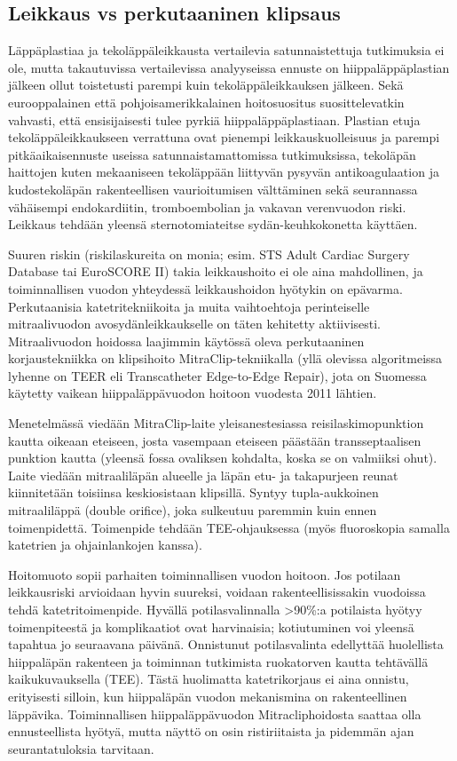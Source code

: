 \documentclass[
]{book}
\begin{document}
\subsection{Leikkaus vs perkutaaninen klipsaus}\label{leikkaus-vs-perkutaaninen-klipsaus}

Läppäplastiaa ja tekoläppäleikkausta vertailevia satunnaistettuja tutkimuksia ei ole, mutta takautuvissa vertailevissa analyyseissa ennuste on hiippaläppäplastian jälkeen ollut toistetusti parempi kuin tekoläppäleikkauksen jälkeen. Sekä eurooppalainen että pohjoisamerikkalainen hoitosuositus suosittelevatkin vahvasti, että ensisijaisesti tulee pyrkiä hiippaläppäplastiaan. Plastian etuja tekoläppäleikkaukseen verrattuna ovat pienempi leikkauskuolleisuus ja parempi pitkäaikaisennuste useissa satunnaistamattomissa tutkimuksissa, tekoläpän haittojen kuten mekaaniseen tekoläppään liittyvän pysyvän antikoagulaation ja kudostekoläpän rakenteellisen vaurioitumisen välttäminen sekä seurannassa vähäisempi endokardiitin, tromboembolian ja vakavan verenvuodon riski. Leikkaus tehdään yleensä sternotomiateitse sydän-keuhkokonetta käyttäen.

Suuren riskin (riskilaskureita on monia; esim. STS Adult Cardiac Surgery Database tai EuroSCORE II) takia leikkaushoito ei ole aina mahdollinen, ja toiminnallisen vuodon yhteydessä leikkaushoidon hyötykin on epävarma. Perkutaanisia katetritekniikoita ja muita vaihtoehtoja perinteiselle mitraalivuodon avosydänleikkaukselle on täten kehitetty aktiivisesti. Mitraalivuodon hoidossa laajimmin käytössä oleva perkutaaninen korjaustekniikka on klipsihoito MitraClip-tekniikalla (yllä olevissa algoritmeissa lyhenne on TEER eli Transcatheter Edge-to-Edge Repair), jota on Suomessa käytetty vaikean hiippaläppävuodon hoitoon vuodesta 2011 lähtien.

Menetelmässä viedään MitraClip-laite yleisanestesiassa reisilaskimopunktion kautta oikeaan eteiseen, josta vasempaan eteiseen päästään transseptaalisen punktion kautta (yleensä fossa ovaliksen kohdalta, koska se on valmiiksi ohut). Laite viedään mitraaliläpän alueelle ja läpän etu- ja takapurjeen reunat kiinnitetään toisiinsa keskiosistaan klipsillä. Syntyy tupla-aukkoinen mitraaliläppä (double orifice), joka sulkeutuu paremmin kuin ennen toimenpidettä. Toimenpide tehdään TEE-ohjauksessa (myös fluoroskopia samalla katetrien ja ohjainlankojen kanssa).

Hoitomuoto sopii parhaiten toiminnallisen vuodon hoitoon. Jos potilaan leikkausriski arvioidaan hyvin suureksi, voidaan rakenteellisissakin vuodoissa tehdä katetritoimenpide. Hyvällä potilasvalinnalla \textgreater90\%:a potilaista hyötyy toimenpiteestä ja komplikaatiot ovat harvinaisia; kotiutuminen voi yleensä tapahtua jo seuraavana päivänä. Onnistunut potilasvalinta edellyttää huolellista hiippaläpän rakenteen ja toiminnan tutkimista ruokatorven kautta tehtävällä kaikukuvauksella (TEE). Tästä huolimatta katetrikorjaus ei aina onnistu, erityisesti silloin, kun hiippaläpän vuodon mekanismina on rakenteellinen läppävika. Toiminnallisen hiippaläppävuodon Mitracliphoidosta saattaa olla ennusteellista hyötyä, mutta näyttö on osin ristiriitaista ja pidemmän ajan seurantatuloksia tarvitaan.
\end{document}
